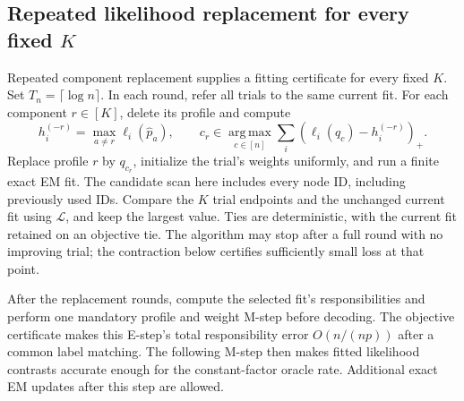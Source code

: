 \documentclass[11pt]{article}
\theoremstyle{definition}
\theoremstyle{remark}
\newcommand{\argmax}{\operatorname*{arg\,max}}
\numberwithin{equation}{section}
\begin{document}
\subsection{Repeated likelihood replacement for every fixed \texorpdfstring{$K$}{K}}
\label{sec:replacement}
Repeated component replacement supplies a fitting certificate for every fixed $K$. Set $T_n=\lceil\log n\rceil$. In each round, refer all trials to the same current fit. For each component $r\in[K]$, delete its profile and compute
\begin{equation}
 h_i^{(-r)}=\max_{a\ne r}\ell_i(\widehat p_a),\qquad
 c_r\in\argmax_{c\in[n]}\sum_i(\ell_i(q_c)-h_i^{(-r)})_+.
 \label{eq:replacement-gain}
\end{equation}
Replace profile $r$ by $q_{c_r}$, initialize the trial's weights uniformly, and run a finite exact EM fit. The candidate scan here includes every node ID, including previously used IDs. Compare the $K$ trial endpoints and the unchanged current fit using $\mathcal L$, and keep the largest value. Ties are deterministic, with the current fit retained on an objective tie. The algorithm may stop after a full round with no improving trial; the contraction below certifies sufficiently small loss at that point.

After the replacement rounds, compute the selected fit's responsibilities and perform one mandatory profile and weight M-step before decoding. The objective certificate makes this E-step's total responsibility error $O(n/(np))$ after a common label matching. The following M-step then makes fitted likelihood contrasts accurate enough for the constant-factor oracle rate. Additional exact EM updates after this step are allowed.

\begin{center}
\end{center}
\end{document}
